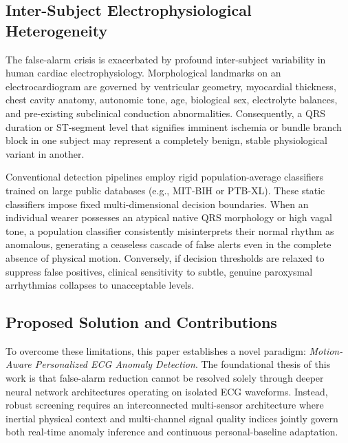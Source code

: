 \documentclass{ieeeaccess}
\begin{document}
\subsection{Inter-Subject Electrophysiological Heterogeneity}
The false-alarm crisis is exacerbated by profound inter-subject variability in human cardiac electrophysiology. Morphological landmarks on an electrocardiogram are governed by ventricular geometry, myocardial thickness, chest cavity anatomy, autonomic tone, age, biological sex, electrolyte balances, and pre-existing subclinical conduction abnormalities. Consequently, a QRS duration or ST-segment level that signifies imminent ischemia or bundle branch block in one subject may represent a completely benign, stable physiological variant in another. 

Conventional detection pipelines employ rigid population-average classifiers trained on large public databases (e.g., MIT-BIH or PTB-XL). These static classifiers impose fixed multi-dimensional decision boundaries. When an individual wearer possesses an atypical native QRS morphology or high vagal tone, a population classifier consistently misinterprets their normal rhythm as anomalous, generating a ceaseless cascade of false alerts even in the complete absence of physical motion. Conversely, if decision thresholds are relaxed to suppress false positives, clinical sensitivity to subtle, genuine paroxysmal arrhythmias collapses to unacceptable levels.

\subsection{Proposed Solution and Contributions}
To overcome these limitations, this paper establishes a novel paradigm: \textit{Motion-Aware Personalized ECG Anomaly Detection}. The foundational thesis of this work is that false-alarm reduction cannot be resolved solely through deeper neural network architectures operating on isolated ECG waveforms. Instead, robust screening requires an interconnected multi-sensor architecture where inertial physical context and multi-channel signal quality indices jointly govern both real-time anomaly inference and continuous personal-baseline adaptation.
\end{document}
